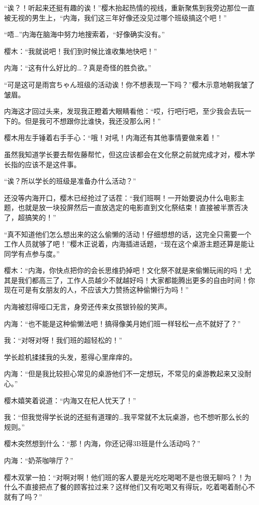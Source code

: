 “诶？！听起来还挺有趣的诶！”樱木抬起热情的视线，重新聚焦到我旁边那位一直被无视的男生上，“内海，我们这三年好像还没见过哪个班级搞这个吧！”

“唔…”内海在脑海中努力地搜索着，“好像确实没有。”

樱木：“我就说吧！我们到时候比谁收集地快吧！”

内海：“这有什么好比的…？真是奇怪的胜负欲。”

“可是这可是雨宫ちゃん班级的活动诶！你不想表现一下吗？”樱木示意地朝我皱了皱眉。

内海这才回过头来，发现我正瞪着大眼睛看他：“哎，行吧行吧，至少我会去玩一下的。但是我可不想跟你比谁快，我还没那么闲！”

樱木用左手锤着右手手心：“哦！对吼！内海还有其他事情要做来着！”

虽然我知道学长要去帮佐藤帮忙，但这应该都会在文化祭之前就完成才对，樱木学长指的应该不是这件事。

“诶？所以学长的班级是准备办什么活动？”

还没等内海开口，樱木已经抢过了话茬：“我们班啊！一开始要说办什么电影主题，也就是放一块投屏然后一直放选定的电影直到文化祭结束！直接被半票否决了，超搞笑的！”

“真不知道他们怎么想出来的这么偷懒的活动！仔细想想的话，这完全只需要一个工作人员就够了吧！”樱木正说着，内海插进话题，“现在这个桌游主题还算是能让同学有点参与度。”

樱木：“内海，你快点把你的会长思维扔掉吧！文化祭不就是来偷懒玩闹的吗！尤其是我们都高三了，工作人员越少不就越好吗！大家都能腾出更多的自由时间！你现在可是有女朋友的人，不应该大力赞扬这种偷懒行为吗！”

内海被怼得哑口无言，身旁还传来女孩银铃般的笑声。

内海：“也不能是这种偷懒法吧！搞得像美月她们班一样轻松一点不就好了？”

我：“对呀对呀！我们班的超轻松的！”

学长趁机揉揉我的头发，惹得心里痒痒的。

内海：“但是我比较担心常见的桌游他们不一定想玩，不常见的桌游教起来又没耐心。”

樱木嬉笑着说道：“内海又在杞人忧天了！”

我：“但我觉得学长说的还挺有道理的…我平常就不太玩桌游，也不想听那么长的规则。”

樱木突然想到什么：“那！内海，你还记得3B班是什么活动吗？”

内海：“奶茶咖啡厅？”

樱木双掌一拍：“对啊对啊！他们班的客人要是光吃吃喝喝不是也很无聊吗？！为什么不直接把点了餐的顾客拉过来？这样他们又有吃喝又有得玩，吃着喝着耐心不就有了吗？”

